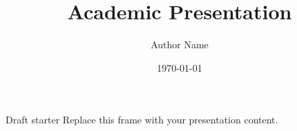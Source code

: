 \documentclass[aspectratio=169]{beamer}
\title{Academic Presentation}
\author{Author Name}
\date{\today}
\begin{document}
\maketitle

\begin{frame}{Draft starter}
Replace this frame with your presentation content.
\end{frame}
\end{document}
